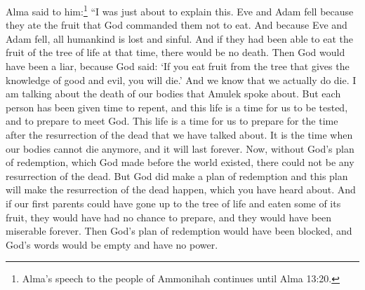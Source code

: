 Alma said to him:\footnote{Alma's speech to the people of Ammonihah continues until Alma 13:20.} ``I was just about to explain this. Eve and Adam fell because they ate the fruit that God commanded them not to eat. And because Eve and Adam fell, all humankind is lost and sinful.
\bverse \iffalse And now behold, I say unto you that if it had been possible for Adam to have partaken of the fruit of the tree of life at that time, there would have been no death, and the word would have been void, making God a liar, for he said: If thou eat thou shalt surely die. \fi
And if they had been able to eat the fruit of the tree of life at that time, there would be no death. Then God would have been a liar, because God said: \lq If you eat fruit from the tree that gives the knowledge of good and evil, you will die.\rq 
\bverse \iffalse And we see that death comes upon mankind, yea, the death which has been spoken of by Amulek, which is the temporal death; nevertheless there was a space granted unto man in which he might repent; therefore this life became a probationary state; a time to prepare to meet God; a time to prepare for that endless state which has been spoken of by us, which is after the resurrection of the dead. \fi
And we know that we actually do die. I am talking about the death of our bodies that Amulek spoke about. But each person has been given time to repent, and this life is a time for us to be tested, and to prepare to meet God. This life is a time for us to prepare for the time after the resurrection of the dead that we have talked about. It is the time when our bodies cannot die anymore, and it will last forever.
\bverse \iffalse Now, if it had not been for the plan of redemption, which was laid from the foundation of the world, there could have been no resurrection of the dead; but there was a plan of redemption laid, which shall bring to pass the resurrection of the dead, of which has been spoken. \fi
Now, without God's plan of redemption, which God made before the world existed, there could not be any resurrection of the dead. But God did make a plan of redemption and this plan will make the resurrection of the dead happen, which you have heard about.
\bverse \iffalse And now behold, if it were possible that our first parents could have gone forth and partaken of the tree of life they would have been forever miserable, having no preparatory state; and thus the plan of redemption would have been frustrated, and the word of God would have been void, taking none effect. \fi
And if our first parents could have gone up to the tree of life and eaten some of its fruit, they would have had no chance to prepare, and they would have been miserable forever. Then God's plan of redemption would have been blocked, and God's words would be empty and have no power.
